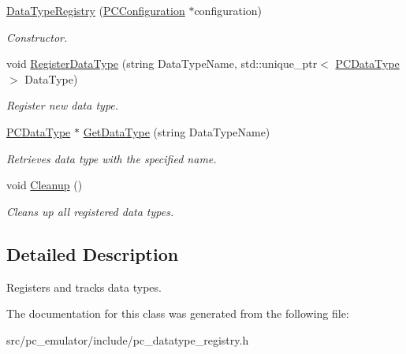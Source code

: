 \begin{DoxyCompactItemize}
\item 
\hyperlink{classpc__emulator_1_1DataTypeRegistry_ae181a1e06e9c371b478f3f4a40aa3d05}{Data\+Type\+Registry} (\hyperlink{classpc__emulator_1_1PCConfiguration}{P\+C\+Configuration} $\ast$configuration)\hypertarget{classpc__emulator_1_1DataTypeRegistry_ae181a1e06e9c371b478f3f4a40aa3d05}{}\label{classpc__emulator_1_1DataTypeRegistry_ae181a1e06e9c371b478f3f4a40aa3d05}

\begin{DoxyCompactList}\small\item\em Constructor. \end{DoxyCompactList}\item 
void \hyperlink{classpc__emulator_1_1DataTypeRegistry_aeb42f0888bb6a866c5cb497f4c55e79d}{Register\+Data\+Type} (string Data\+Type\+Name, std\+::unique\+\_\+ptr$<$ \hyperlink{classpc__emulator_1_1PCDataType}{P\+C\+Data\+Type} $>$ Data\+Type)\hypertarget{classpc__emulator_1_1DataTypeRegistry_aeb42f0888bb6a866c5cb497f4c55e79d}{}\label{classpc__emulator_1_1DataTypeRegistry_aeb42f0888bb6a866c5cb497f4c55e79d}

\begin{DoxyCompactList}\small\item\em Register new data type. \end{DoxyCompactList}\item 
\hyperlink{classpc__emulator_1_1PCDataType}{P\+C\+Data\+Type} $\ast$ \hyperlink{classpc__emulator_1_1DataTypeRegistry_a1140ec01678f40daed5035f5e8cac6ce}{Get\+Data\+Type} (string Data\+Type\+Name)\hypertarget{classpc__emulator_1_1DataTypeRegistry_a1140ec01678f40daed5035f5e8cac6ce}{}\label{classpc__emulator_1_1DataTypeRegistry_a1140ec01678f40daed5035f5e8cac6ce}

\begin{DoxyCompactList}\small\item\em Retrieves data type with the specified name. \end{DoxyCompactList}\item 
void \hyperlink{classpc__emulator_1_1DataTypeRegistry_ae67e87cb84212168f8784fe90d95a3dc}{Cleanup} ()\hypertarget{classpc__emulator_1_1DataTypeRegistry_ae67e87cb84212168f8784fe90d95a3dc}{}\label{classpc__emulator_1_1DataTypeRegistry_ae67e87cb84212168f8784fe90d95a3dc}

\begin{DoxyCompactList}\small\item\em Clean\textquotesingle{}s up all registered data types. \end{DoxyCompactList}\end{DoxyCompactItemize}


\subsection{Detailed Description}
Registers and tracks data types. 

The documentation for this class was generated from the following file\+:\begin{DoxyCompactItemize}
\item 
src/pc\+\_\+emulator/include/pc\+\_\+datatype\+\_\+registry.\+h\end{DoxyCompactItemize}
